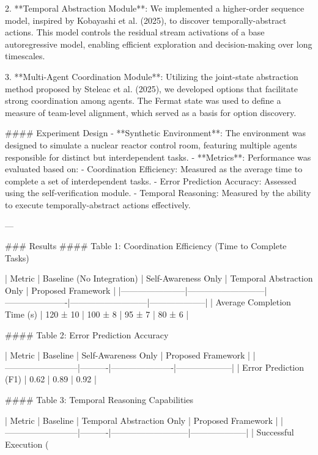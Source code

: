 2. **Temporal Abstraction Module**: We implemented a higher-order sequence model, inspired by Kobayashi et al. (2025), to discover temporally-abstract actions. This model controls the residual stream activations of a base autoregressive model, enabling efficient exploration and decision-making over long timescales.  

3. **Multi-Agent Coordination Module**: Utilizing the joint-state abstraction method proposed by Steleac et al. (2025), we developed options that facilitate strong coordination among agents. The Fermat state was used to define a measure of team-level alignment, which served as a basis for option discovery.  

#### Experiment Design  
- **Synthetic Environment**: The environment was designed to simulate a nuclear reactor control room, featuring multiple agents responsible for distinct but interdependent tasks.  
- **Metrics**: Performance was evaluated based on:  
  - Coordination Efficiency: Measured as the average time to complete a set of interdependent tasks.  
  - Error Prediction Accuracy: Assessed using the self-verification module.  
  - Temporal Reasoning: Measured by the ability to execute temporally-abstract actions effectively.  

---

### Results  
#### Table 1: Coordination Efficiency (Time to Complete Tasks)

| Metric               | Baseline (No Integration) | Self-Awareness Only | Temporal Abstraction Only | Proposed Framework |
|-----------------------|---------------------------|----------------------|---------------------------|--------------------|
| Average Completion Time (s) | 120 ± 10               | 100 ± 8              | 95 ± 7                    | 80 ± 6             |

#### Table 2: Error Prediction Accuracy

| Metric                  | Baseline | Self-Awareness Only | Proposed Framework |
|--------------------------|----------|----------------------|--------------------|
| Error Prediction (F1)    | 0.62     | 0.89                 | 0.92               |

#### Table 3: Temporal Reasoning Capabilities

| Metric                  | Baseline | Temporal Abstraction Only | Proposed Framework |
|--------------------------|----------|---------------------------|--------------------|
| Successful Execution (%

